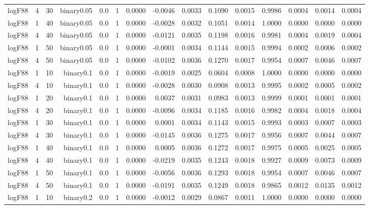 \begin{longtable}{rrrrrrrrrrrrrrr}
  logF88 & 4 & 30 & binary0.05 & 0.0 & 1 & 0.0000 & -0.0046 & 0.0033 & 0.1090 & 0.0015 & 0.9986 & 0.0004 & 0.0014 & 0.0004 \\ 
  logF88 & 1 & 40 & binary0.05 & 0.0 & 1 & 0.0000 & -0.0028 & 0.0032 & 0.1051 & 0.0014 & 1.0000 & 0.0000 & 0.0000 & 0.0000 \\ 
  logF88 & 4 & 40 & binary0.05 & 0.0 & 1 & 0.0000 & -0.0121 & 0.0035 & 0.1198 & 0.0016 & 0.9981 & 0.0004 & 0.0019 & 0.0004 \\ 
  logF88 & 1 & 50 & binary0.05 & 0.0 & 1 & 0.0000 & -0.0001 & 0.0034 & 0.1144 & 0.0015 & 0.9994 & 0.0002 & 0.0006 & 0.0002 \\ 
  logF88 & 4 & 50 & binary0.05 & 0.0 & 1 & 0.0000 & -0.0102 & 0.0036 & 0.1270 & 0.0017 & 0.9954 & 0.0007 & 0.0046 & 0.0007 \\ 
  logF88 & 1 & 10 & binary0.1 & 0.0 & 1 & 0.0000 & -0.0019 & 0.0025 & 0.0604 & 0.0008 & 1.0000 & 0.0000 & 0.0000 & 0.0000 \\ 
  logF88 & 4 & 10 & binary0.1 & 0.0 & 1 & 0.0000 & -0.0028 & 0.0030 & 0.0908 & 0.0013 & 0.9995 & 0.0002 & 0.0005 & 0.0002 \\ 
  logF88 & 1 & 20 & binary0.1 & 0.0 & 1 & 0.0000 & 0.0037 & 0.0031 & 0.0983 & 0.0013 & 0.9999 & 0.0001 & 0.0001 & 0.0001 \\ 
  logF88 & 4 & 20 & binary0.1 & 0.0 & 1 & 0.0000 & -0.0096 & 0.0034 & 0.1185 & 0.0016 & 0.9982 & 0.0004 & 0.0018 & 0.0004 \\ 
  logF88 & 1 & 30 & binary0.1 & 0.0 & 1 & 0.0000 & 0.0001 & 0.0034 & 0.1143 & 0.0015 & 0.9993 & 0.0003 & 0.0007 & 0.0003 \\ 
  logF88 & 4 & 30 & binary0.1 & 0.0 & 1 & 0.0000 & -0.0145 & 0.0036 & 0.1275 & 0.0017 & 0.9956 & 0.0007 & 0.0044 & 0.0007 \\ 
  logF88 & 1 & 40 & binary0.1 & 0.0 & 1 & 0.0000 & 0.0005 & 0.0036 & 0.1272 & 0.0017 & 0.9975 & 0.0005 & 0.0025 & 0.0005 \\ 
  logF88 & 4 & 40 & binary0.1 & 0.0 & 1 & 0.0000 & -0.0219 & 0.0035 & 0.1243 & 0.0018 & 0.9927 & 0.0009 & 0.0073 & 0.0009 \\ 
  logF88 & 1 & 50 & binary0.1 & 0.0 & 1 & 0.0000 & -0.0056 & 0.0036 & 0.1293 & 0.0018 & 0.9954 & 0.0007 & 0.0046 & 0.0007 \\ 
  logF88 & 4 & 50 & binary0.1 & 0.0 & 1 & 0.0000 & -0.0191 & 0.0035 & 0.1249 & 0.0018 & 0.9865 & 0.0012 & 0.0135 & 0.0012 \\ 
  logF88 & 1 & 10 & binary0.2 & 0.0 & 1 & 0.0000 & -0.0012 & 0.0029 & 0.0867 & 0.0011 & 1.0000 & 0.0000 & 0.0000 & 0.0000 \\ 

\end{longtable}
